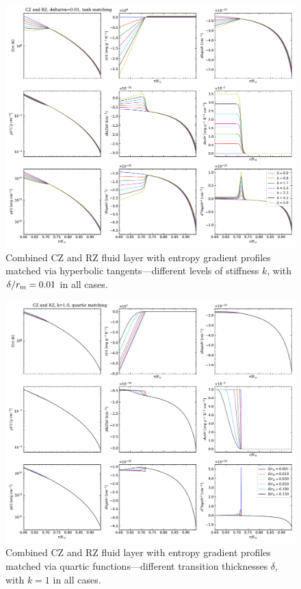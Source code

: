 \documentclass[12pt]{article} %
\newcommand{\rrm}{r_{\rm{m}}}
\begin{document}
\begin{figure}
	\includegraphics[scale=0.6]{figures/CZ_RZ_tanhmatch_vs_k.pdf}
	\caption{Combined CZ and RZ fluid layer with entropy gradient profiles matched via hyperbolic tangents---different levels of stiffness $k$, with $\delta/\rrm=0.01$ in all cases.}
	\label{fig:CZ_RZ_tanhmatch_vs_k}
\end{figure}
\begin{figure}
	\includegraphics[scale=0.6]{figures/CZ_RZ_quartmatch_vs_delta.pdf}
	\caption{Combined CZ and RZ fluid layer with entropy gradient profiles matched via quartic functions---different transition thicknesses $\delta$, with $k=1$ in all cases.}
	\label{fig:CZ_RZ_quartmatch_vs_delta}
\end{figure}
\end{document}
